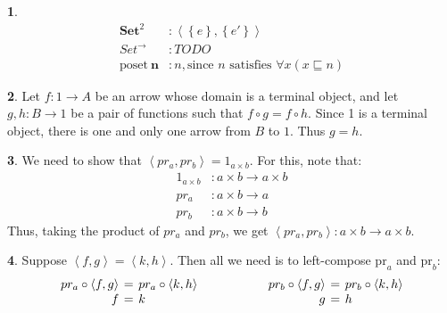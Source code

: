 \documentclass{article}
\theoremstyle{definition}
\newcommand{\set}[1]{\left\{#1\right\}}
\newcommand{\ang}[1]{\left\langle #1 \right\rangle}
\newcommand{\Set}{\mathbf{Set}}
\theoremstyle{definition}
\newtheorem{solution-internal}{}[subsection]
\newenvironment{solution}{
  \begin{solution-internal}
}{
  \end{solution-internal}
}
\begin{document}
\setcounter{subsection}{6}
\setcounter{solution-internal}{0}
\begin{solution}
  \begin{align*}
    \Set^2 &: \ang{\set{e}, \set{e'}} \\
    Set^{\rightarrow} &: TODO \\
    \text{poset}~\mathbf{n} &: n, \text{since $n$ satisfies $\forall x (x \sqsubseteq n)$}
  \end{align*}
\end{solution}

\begin{solution}
  Let $f\colon 1 \to A$ be an arrow whose domain is a terminal object, and
  let $g, h \colon B \to 1$ be a pair of functions such that $f \circ g = f
  \circ h$. Since 1 is a terminal object, there is one and only one arrow from
  $B$ to $1$. Thus $g = h$.
\end{solution}

\setcounter{subsection}{8}
\setcounter{solution-internal}{0}
\begin{solution}
  We need to show that $\ang{pr_a, pr_b} = 1_{a \times b}$. For
  this, note that:
  \begin{align*}
    1_{a \times b} &\colon a \times b \to a \times b \\
    pr_a           &\colon a \times b \to a \\
    pr_b           &\colon a \times b \to b
  \end{align*}
  Thus, taking the product of $pr_a$ and $pr_b$, we get $\ang{pr_a, pr_b} \colon a \times b \to a \times b$.

  \begin{center}
  \end{center}
\end{solution}

\begin{solution}
  Suppose $\ang{f, g} = \ang{k, h}$. Then all we need
  is to left-compose $\text{pr}_a$ and $\text{pr}_b$:
  \[
    \arraycolsep=2pt
    \begin{array}{rcl @{\hspace{2cm}} rcl}
      pr_a \circ \ang{f,g} &=& pr_a \circ \ang{k, h} & pr_b \circ
      \ang{f, g} &=& pr_b \circ \ang{k, h} \\
    f &=& k & g &=& h
  \end{array}
  \]
\end{solution}
\end{document}
